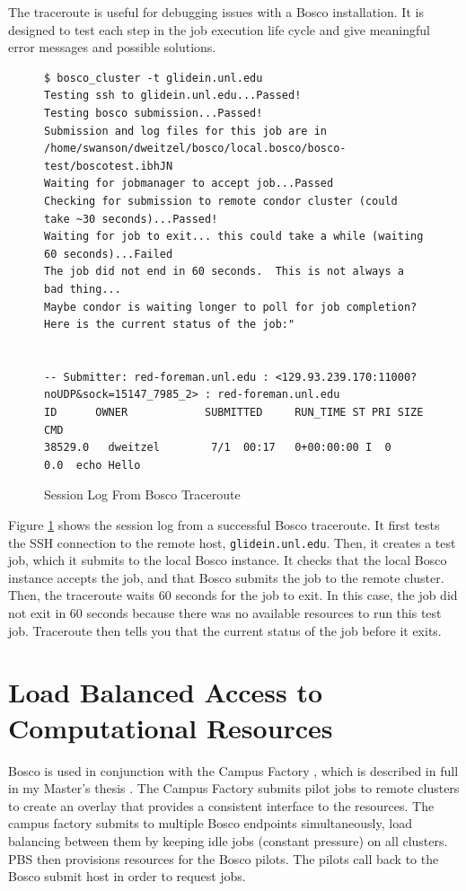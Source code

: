 The traceroute is useful for debugging issues with a Bosco installation.  It is designed to test each step in the job execution life cycle and give meaningful error messages and possible solutions.

\begin{figure}[h!t]
\begin{lstlisting}[basicstyle=\scriptsize\ttfamily]
$ bosco_cluster -t glidein.unl.edu
Testing ssh to glidein.unl.edu...Passed!
Testing bosco submission...Passed!
Submission and log files for this job are in /home/swanson/dweitzel/bosco/local.bosco/bosco-test/boscotest.ibhJN
Waiting for jobmanager to accept job...Passed
Checking for submission to remote condor cluster (could take ~30 seconds)...Passed!
Waiting for job to exit... this could take a while (waiting 60 seconds)...Failed
The job did not end in 60 seconds.  This is not always a bad thing...
Maybe condor is waiting longer to poll for job completion?
Here is the current status of the job:"


-- Submitter: red-foreman.unl.edu : <129.93.239.170:11000?noUDP&sock=15147_7985_2> : red-foreman.unl.edu
ID      OWNER            SUBMITTED     RUN_TIME ST PRI SIZE CMD               
38529.0   dweitzel        7/1  00:17   0+00:00:00 I  0   0.0  echo Hello   
\end{lstlisting}
\caption{Session Log From Bosco Traceroute}
\label{lst:boscotraceroute}
\end{figure}

Figure \ref{lst:boscotraceroute} shows the session log from a successful Bosco traceroute.  It first tests the SSH connection to the remote host, \texttt{glidein.unl.edu}.  Then, it creates a test job, which it submits to the local Bosco instance.  It checks that the local Bosco instance accepts the job, and that Bosco submits the job to the remote cluster.  Then, the traceroute waits 60 seconds for the job to exit.  In this case, the job did not exit in 60 seconds because there was no available resources to run this test job.  Traceroute then tells you that the current status of the job before it exits.


\section{Load Balanced Access to Computational Resources}

Bosco is used in conjunction with the Campus Factory \cite{website:campusfactory}, which is described in full in my Master's thesis \cite{weitzel2011campus}.  The Campus Factory submits pilot jobs to remote clusters to create an overlay that provides a consistent interface to the resources.  The campus factory submits to multiple Bosco endpoints simultaneously, load balancing between them by keeping idle jobs (constant pressure) on all clusters.  PBS then provisions resources for the Bosco pilots.  The pilots call back to the Bosco submit host in order to request jobs.


